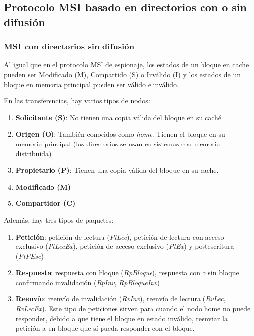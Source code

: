 \documentclass[10pt,a4paper,spanish]{report}
\begin{document}
\newpage
\textcolor[rgb]{0.2,0.4,0.8}{\subsection{Protocolo MSI basado en directorios con o sin difusión}}
\textcolor[rgb]{0.2,0.4,0.8}{\subsubsection{MSI con directorios sin difusión}}
Al igual que en el protocolo MSI de espionaje, los estados de un bloque en cache pueden ser Modificado (M), Compartido (S) o Inválido (I) y los estados de un bloque en memoria principal pueden ser válido e inválido.

En las transferencias, hay varios tipos de nodos:
\begin{enumerate}[\color{azul}{\bf $\heartsuit$}]
    \item \textcolor[rgb]{0.2,0.4,0.8}{\textbf{Solicitante (S)}}: No tienen una copia válida del bloque en su caché
    \item \textcolor[rgb]{0.2,0.4,0.8}{\textbf{Origen (O)}}: También conocidos como \textcolor[rgb]{0.2,0.4,0.8}{\textit{home}}. Tienen el bloque en su memoria principal (los directorios se usan en sistemas con memoria distribuida).
    \item \textcolor[rgb]{0.2,0.4,0.8}{\textbf{Propietario (P)}}: Tienen una copia válida del bloque en su cache.
    \item \textcolor[rgb]{0.2,0.4,0.8}{\textbf{Modificado (M)}}
    \item \textcolor[rgb]{0.2,0.4,0.8}{\textbf{Compartidor (C)}}
\end{enumerate}

Además, hay tres tipos de paquetes: 
\begin{enumerate}[\color{azul}{\bf $\heartsuit$}]
    \item \textbf{\textcolor[rgb]{0.2,0.4,0.8}{Petición}}: petición de lectura (\textcolor[rgb]{0.2,0.4,0.8}{\textit{PtLec}}), petición de lectura con acceso exclusivo (\textcolor[rgb]{0.2,0.4,0.8}{\textit{PtLecEx}}), petición de acceso exclusivo (\textcolor[rgb]{0.2,0.4,0.8}{\textit{PtEx}}) y postescritura (\textcolor[rgb]{0.2,0.4,0.8}{\textit{PtPEsc}})
    \item \textcolor[rgb]{0.2,0.4,0.8}{\textbf{Respuesta}}: respuesta con bloque (\textcolor[rgb]{0.2,0.4,0.8}{\textit{RpBloque}}), respuesta con o sin bloque confirmando invalidación (\textcolor[rgb]{0.2,0.4,0.8}{\textit{RpInv}}, \textit{\textcolor[rgb]{0.2,0.4,0.8}{RpBloqueInv}})
    \item \textcolor[rgb]{0.2,0.4,0.8}{\textbf{Reenvío}}: reenvío de invalidación (\textcolor[rgb]{0.2,0.4,0.8}{\textit{RvInv}}), reenvío de lectura (\textcolor[rgb]{0.2,0.4,0.8}{\textit{RvLec}}, \textcolor[rgb]{0.2,0.4,0.8}{\textit{RvLecEx}}). Este tipo de peticiones sirven para cuando el nodo home no puede responder, debido a que tiene el bloque en estado inválido, reenviar la petición a un bloque que sí pueda responder con el bloque.
\end{enumerate}
\end{document}
